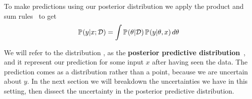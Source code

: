 To make predictions using our posterior distribution we apply the product and sum rules~\citep{mackay2003information} to get
\begin{equation}
    \label{eq:bayesian_predictive}
    \mathbb{P}_{}(y|x; \mathcal{D})=  \int \mathbb{P}_{}(\theta | \mathcal{D})\, \mathbb{P}_{}(y|\theta, x) \, d\theta
\end{equation}{}

We will refer to the distribution , as the \textbf{posterior predictive distribution}~\citep{barbieri2014posterior}, and it represent our prediction for some input $x$ after having seen the data. The prediction comes as a distribution rather than a point, because we are uncertain about $y$. In the next section we will breakdown the uncertainties we have in this setting, then dissect the uncertainty in the posterior predictive distribution. 






